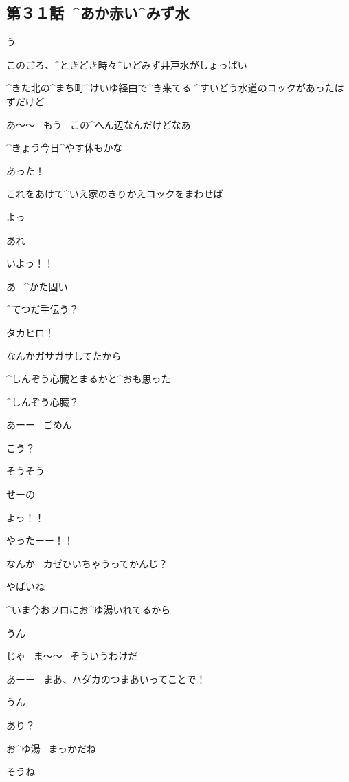 \subsection{第３１話\ ^{あか}{赤}い^{みず}{水}}

\page[110]
\Alpha う

\page
\Alpha このごろ、^{ときどき}{時々}^{いどみず}{井戸水}がしょっぱい

\Alpha ^{きた}{北}の^{まち}{町}^{けいゆ}{経由}で^{き}{来}てる
^{すいどう}{水道}のコックがあったはずだけど

\page
\Alpha あ〜〜
\ もう
\ この^{へん}{辺}なんだけどなあ

\Alpha ^{きょう}{今日}^{やす}{休}もかな

\page
\Alpha あった！

\Alpha これをあけて^{いえ}{家}のきりかえコックをまわせば

\Alpha よっ

\Alpha あれ

\Alpha いよっ！！

\Alpha あ
\ ^{かた}{固}い

\page
\Takahiro ^{てつだ}{手伝}う？

\Alpha タカヒロ！

\Takahiro なんかガサガサしてたから

\Alpha ^{しんぞう}{心臓}とまるかと^{おも}{思}った

\Alpha ^{しんぞう}{心臓}？

\Takahiro あーー
\ ごめん

\page
\Takahiro こう？

\Alpha そうそう

\Alpha せーの

\Alpha よっ！！

\Alpha やったーー！！

\page[117]
\Alpha なんか
\ カゼひいちゃうってかんじ？

\Takahiro やばいね

\Alpha ^{いま}{今}おフロにお^{ゆ}{湯}いれてるから

\Takahiro うん

\Alpha じゃ
\ ま〜〜
\ そういうわけだ

\page
\Alpha あーー
\ まあ、ハダカのつまあいってことで！

\Takahiro うん

\Alpha あり？

\page
\Takahiro お^{ゆ}{湯}
\ まっかだね

\Alpha そうね

